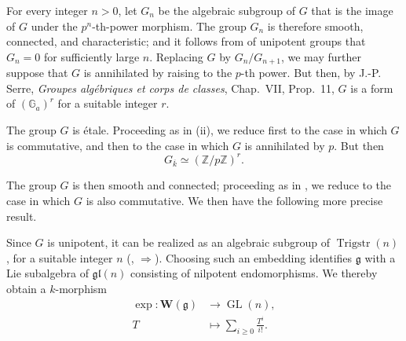 For every integer \(n>0\), let \(G_n\) be the algebraic subgroup of
\(G\) that is the image of \(G\) under the \(p^n\)-th-power
morphism.  The group \(G_n\) is therefore smooth, connected, and
characteristic; and it follows from  of unipotent
groups that \(G_n=0\) for sufficiently large \(n\).  Replacing \(G\)
by \(G_n/G_{n+1}\), we may further suppose that \(G\) is annihilated
by raising to the \(p\)-th power.  But then, by J.-P. Serre,
\emph{Groupes algébriques et corps de classes}, Chap.~VII,
Prop.~11, \(G\) is a form of \((\mathbb G_a)^r\) for a suitable
integer \(r\).



The group \(G\) is étale.  Proceeding as in (ii), we reduce first to
the case in which \(G\) is commutative, and then to the case in which
\(G\) is annihilated by \(p\).  But then
\[
  G_{\overline{k}}\simeq(\mathbb Z/p\mathbb Z)^r.
\]

The group \(G\) is then smooth and connected; proceeding as in
, we reduce to the case in which \(G\) is also commutative.
We then have the following more precise result.


Since \(G\) is unipotent, it can be realized as an algebraic
subgroup of \(\operatorname{Trigstr}(n)\), for a suitable integer
\(n\) (, \(\Rightarrow\)).  Choosing such an embedding
identifies \(\mathfrak g\) with a Lie subalgebra of
\(\mathfrak{gl}(n)\) consisting of nilpotent endomorphisms.  We
thereby obtain a \(k\)-morphism
\[
  \begin{aligned}
  \exp:\mathbf W(\mathfrak g)&\longrightarrow
    \operatorname{GL}(n),\\
  T&\longmapsto\sum_{i\geq0}\frac{T^i}{i!}.
  \end{aligned}
\]


